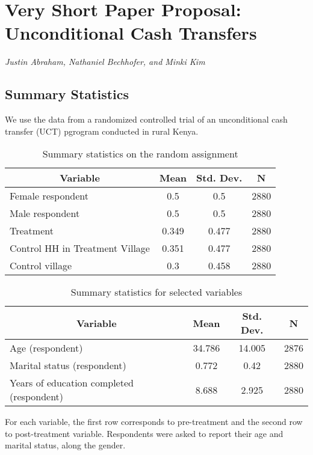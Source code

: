 \documentclass[11pt]{article}
\begin{document}
\section*{Very Short Paper Proposal: Unconditional Cash Transfers}

\noindent \textit{Justin Abraham, Nathaniel Bechhofer, and Minki Kim} \\

\subsection*{Summary Statistics}
We use the data from a randomized controlled trial of an unconditional cash transfer (UCT) pgrogram conducted in rural Kenya. 

 \begin{table}[htbp]\centering \caption{Summary statistics on the random assignment \label{sumstat}}
	\begin{tabular}{l c c  c}\hline\hline
		\multicolumn{1}{c}{\textbf{Variable}} & \textbf{Mean}
		& \textbf{Std. Dev.} & \textbf{N}\\ \hline
		Female respondent & 0.5 & 0.5  & 2880\\
		Male respondent & 0.5 & 0.5  & 2880\\
		Treatment & 0.349 & 0.477  & 2880\\
		Control HH in Treatment Village & 0.351 & 0.477  & 2880\\
		Control village & 0.3 & 0.458  & 2880\\
			\hline
	\end{tabular}
\end{table}



    \begin{table}[h]\centering \caption{Summary statistics for selected variables  \label{sumstat}}
    	\begin{tabular}{l c c  c}\hline\hline
    		\multicolumn{1}{c}{\textbf{Variable}} & \textbf{Mean}
    		& \textbf{Std. Dev.} & \textbf{N}\\ \hline
    		Age (respondent) & 34.786 & 14.005  & 2876\\
    		Marital status (respondent) & 0.772 & 0.42  & 2880\\
    		Years of education completed (respondent) & 8.688 & 2.925  & 2880\\
    			\hline
    	\end{tabular}
    \end{table}
For each variable, the first row corresponds to pre-treatment and the second row to post-treatment variable. Respondents were asked to report their age and marital status, along the gender.
\end{document}
